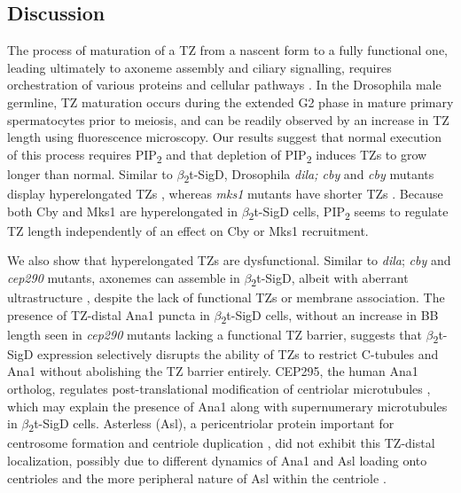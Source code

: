 \documentclass[12pt, twoside, letterpaper]{article}
\newcommand{\PIP}{PIP\textsubscript{2}}
\newcommand{\sigd}{$\beta$\textsubscript{2}t-SigD}
\begin{document}
\begin{doublespacing}
\begin{linenumbers}
    \section*{Discussion}
    The process of maturation of a TZ from a nascent form to a fully functional one,
    leading ultimately to axoneme assembly and ciliary signalling,
    requires orchestration of various proteins and cellular pathways
    \citep{reiter2012base, gonccalves2017ciliary}.
    In the Drosophila male germline, TZ maturation occurs during the
    extended G2 phase in mature primary spermatocytes prior to meiosis, and can be readily
    observed by an increase in TZ length using fluorescence microscopy.
    Our results suggest that normal execution of this process
    requires \PIP{} and that depletion of \PIP{} induces TZs to
    grow longer than normal.
    Similar to \sigd{}, Drosophila \textit{dila; cby} and \textit{cby}
    mutants display hyperelongated TZs
    \citep{enjolras2012drosophila,vieillard2016transition},
    whereas \textit{mks1} mutants have shorter TZs \citep{pratt2016drosophila}.
    Because both Cby and Mks1 are hyperelongated in \sigd{} cells,
    \PIP{} seems to regulate TZ length independently of an effect on Cby or Mks1 recruitment.

    We also show that hyperelongated TZs are dysfunctional.
    Similar to \textit{dila}; \textit{cby} \citep{vieillard2016transition} and
    \textit{cep290} \citep{basiri2014migrating}
    mutants, axonemes can assemble in \sigd{}, albeit
    with aberrant ultrastructure
    \citep{wei2008depletion}, despite the lack of functional TZs
    or membrane association.
    The presence of TZ-distal Ana1 puncta in \sigd{} cells, without an increase
    in BB length seen in \textit{cep290} mutants lacking a functional TZ barrier,
    suggests that \sigd{} expression selectively disrupts the ability of TZs to restrict C-tubules and
    Ana1 without abolishing the TZ barrier entirely.
    CEP295, the human Ana1 ortholog, regulates
    post-translational modification of centriolar
    microtubules \citep{chang2016cep295}, which may explain the presence of Ana1 along with
    supernumerary microtubules in \sigd{} cells.
    Asterless (Asl), a pericentriolar protein
    important for centrosome formation and centriole duplication
    \citep{blachon2008drosophila, dzhindzhev2010asterless}, did not
    exhibit this TZ-distal localization, possibly due to different dynamics of Ana1 and Asl
    loading onto centrioles \citep{fu2016conserved, saurya2016drosophila} and the
    more peripheral nature of Asl within the centriole \citep{blachon2008drosophila}.


\end{linenumbers}
\end{doublespacing}
\end{document}
